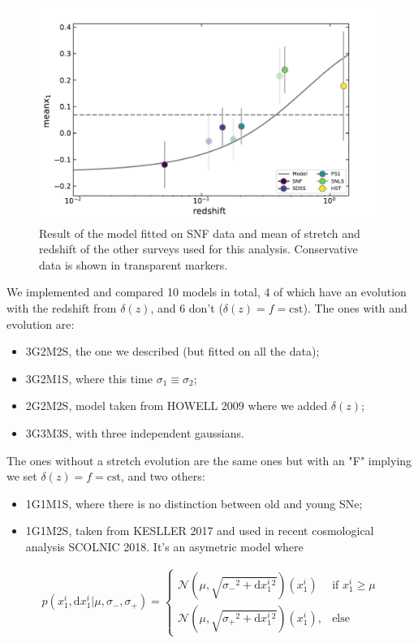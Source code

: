 \documentclass[]{aa} %
\begin{document}
\begin{figure}
    \centering
    \includegraphics[width=\linewidth]{Article_figures/stretchevol_model_maglim-cuts.pdf}
    \caption{Result of the model fitted on SNF data and mean of stretch and redshift of the other surveys used for this analysis. Conservative data is shown in transparent markers.}
    \label{fig:snf_model}
\end{figure}

We implemented and compared 10 models in total, 4 of which have an
evolution with the redshift from $\delta(z)$, and 6 don't ($\delta(z) = f =
\mathrm{cst}$). The ones with and evolution are:
\begin{itemize}
    \item 3G2M2S, the one we described (but fitted on all the data);
    \item 3G2M1S, where this time $\sigma_1 \equiv \sigma_2$;
    \item 2G2M2S, model taken from HOWELL 2009 where we added $\delta(z)$;
    \item 3G3M3S, with three independent gaussians.
\end{itemize}
The ones without a stretch evolution are the same ones but with an "F" implying
we set $\delta(z) = f = \mathrm{cst}$, and two others:
\begin{itemize}
    \item 1G1M1S, where there is no distinction between old and young SNe;
    \item 1G1M2S, taken from KESLLER 2017 and used in recent cosmological
        analysis SCOLNIC 2018. It's an asymetric model where
\end{itemize}
\begin{align}
 p(x_1^i, \mathrm{d} x_1^i | \mu, \sigma_-, \sigma_+) = 
    \begin{cases}
        \mathcal{N} \left(\mu, \sqrt{\sigma_-{}^2 + \mathrm{d} x_1^i{}^{2}}\right) (x_1^i) & \text{if
        } x_1^i\geq \mu\\
        \mathcal{N} \left(\mu, \sqrt{\sigma_+{}^2 + \mathrm{d} x_1^i{}^{2}}\right) (x_1^i), &
        \text{else}
    \end{cases}
\end{align} 
\end{document}
